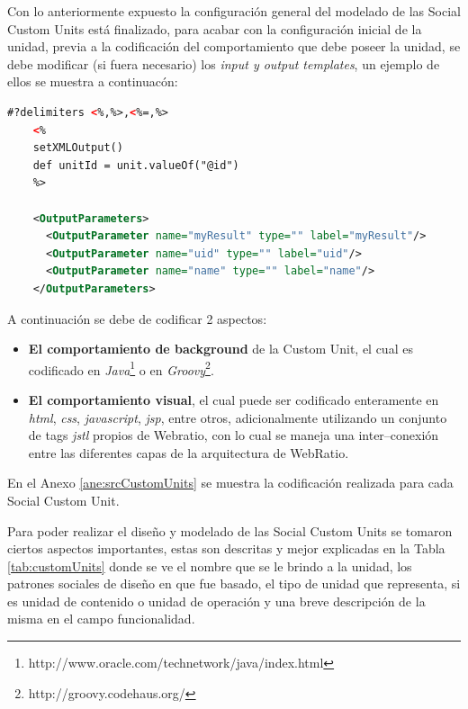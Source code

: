 \documentclass[oneside,12pt,a4paper]{memoir}%
\begin{document}
	Con lo anteriormente expuesto la configuraci\'on general del modelado de las
	Social Custom Units est\'a finalizado, para acabar con la configuraci\'on
	inicial de la unidad, previa a la codificaci\'on del comportamiento que debe
	poseer la unidad, se debe modificar (si fuera necesario) los \textit{input y
	output templates}, un ejemplo de ellos se muestra a continuac\'on:
	
\begin{lstlisting}[language=xml, style=eclipse]
	#?delimiters <%,%>,<%=,%>
	<%
	setXMLOutput()
	def unitId = unit.valueOf("@id")
	%>
	
	<OutputParameters>
	  <OutputParameter name="myResult" type="" label="myResult"/>
	  <OutputParameter name="uid" type="" label="uid"/>
	  <OutputParameter name="name" type="" label="name"/>
	</OutputParameters>      
\end{lstlisting}

	A continuaci\'on se debe de codificar 2 aspectos:
	\begin{itemize}
	  \item \textbf{El comportamiento de background} de la Custom Unit, el cual es
	  codificado en
	  \textit{Java}\footnote{http://www.oracle.com/technetwork/java/index.html} o
	  en \textit{Groovy}\footnote{http://groovy.codehaus.org/}.
	  \item \textbf{El comportamiento visual}, el cual puede ser codificado
	  enteramente en \textit{html}, \textit{css}, \textit{javascript}, \textit{jsp}, entre otros,
	  adicionalmente utilizando un conjunto de tags \textit{jstl} propios de
	  Webratio, con lo cual se maneja una inter--conexi\'on entre las diferentes
	  capas de la arquitectura de WebRatio.
	\end{itemize}
	
	En el Anexo \ref{ane:srcCustomUnits} se muestra la codificaci\'on realizada
	para cada Social Custom Unit.
	
	Para poder realizar el dise\~no y modelado de las Social Custom Units se
	tomaron ciertos aspectos importantes, estas son descritas y mejor explicadas en
	la Tabla \ref{tab:customUnits} donde se ve el nombre que se le brindo a la
	unidad, los patrones sociales de dise\~no en que fue basado, el tipo de unidad
	que representa, si es unidad de contenido o unidad de operaci\'on y una breve
	descripci\'on de la misma en el campo funcionalidad.
\end{document}
